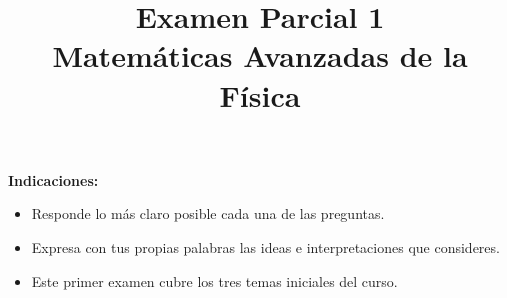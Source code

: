 
\usepackage{enumerate}
\usepackage{pifont}
\renewcommand{\labelitemi}{\ding{43}}
\title{{Examen Parcial 1} \\ {\large Matemáticas Avanzadas de la Física}}
\date{ }

\vspace{-4cm}
\renewcommand\labelenumii{\theenumi.{\arabic{enumii}}}
\maketitle
\fontsize{14}{14}\selectfont
\textbf{Indicaciones:}
\begin{itemize}
\item Responde lo más claro posible cada una de las preguntas.
\item Expresa con tus propias palabras las ideas e interpretaciones que consideres.
\item Este primer examen cubre los tres temas iniciales del curso.
\end{itemize}
